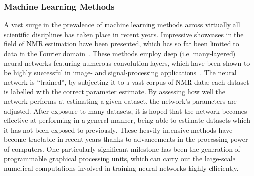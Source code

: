 \subsubsection{Machine Learning Methods}
A vast surge in the prevalence of machine learning methods across virtually
all scientific disciplines has taken place in recent years.
Impressive showcases in the field of \ac{NMR} estimation have been
presented, which has so far been limited to data in the
Fourier domain~\cite{Li2021,Schmid2023}.
These methods employ deep (i.e. many-layered) neural
networks featuring numerous convolution layers, which have been shown to be
highly successful in image- and signal-processing applications~\cite{Lecun1998}.
The neural network is ``trained'', by subjecting it to a vast corpus of
\ac{NMR} data; each dataset is labelled with the correct parameter
estimate. By assessing how well the network performs at estimating a given
dataset, the network's parameters are adjusted. After exposure to
many datasets, it is hoped that the network becomes
effective at performing in a general manner, being able to estimate datasets
which it has not been exposed to previously.
These heavily intensive methods have become tractable in recent years thanks to
advancements in the processing power of computers. One particularly significant
milestone has been the generation of programmable graphical processing
units, which can carry out the large-scale numerical computations involved in
training neural networks highly efficiently.
